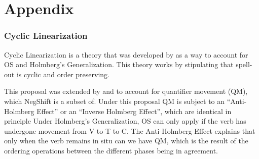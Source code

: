\documentclass[12pt, letterpaper]{article}
\begin{document}



\printbibliography[heading=bibintoc]

\part*{Appendix}

\section*{Cyclic Linearization} \label{sec:CL}

\ea Cyclic Linearization is a theory that was developed by \cite{foxCyclicLinearizationSyntactic2005} as a way to account for OS and Holmberg's Generalization.
\ex This theory works by stipulating that spell-out is cyclic and order preserving. 

\ex This proposal was extended by \citet{foxCyclicLinearizationSyntactic2005} and \citet{engelsMicrovariationObjectPositions2011,engelsScandinavianNegativeIndefinites2012} to account for quantifier movement (QM), which NegShift is a subset of. 
\ex Under this proposal QM is subject to an ``Anti-Holmberg Effect'' or an ``Inverse Holmberg Effect'', which are identical in principle
	\ea Under Holmberg's Generalization, OS can only apply if the verb has undergone movement from V to T to C.
	\ex The Anti-Holmberg Effect explains that only when the verb remains in situ can we have QM, which is the result of the ordering operations between the different phases being in agreement. 
	\z
	\vspace{6pt} 
\end{document}
